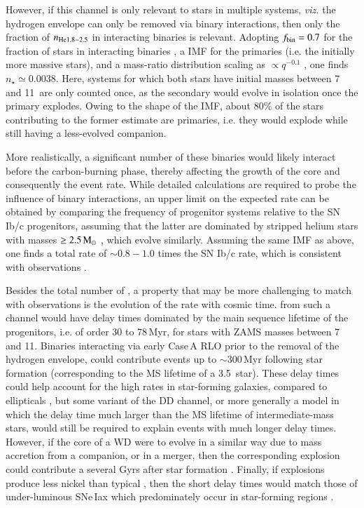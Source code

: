 \documentclass[twocolumn]{aa}
\begin{document}
However, if this channel is only relevant to stars in multiple systems, {\it viz.} the hydrogen envelope can only be removed via binary 
interactions, then only the fraction of $n_{\rm{He}1.8-2.5}$ in interacting binaries is relevant. 
Adopting $f_{\rm bin}=0.7$ for the fraction of stars in interacting binaries \citep{Sana:2012px}, a \cite{Chabrier:2004vw} IMF for the primaries (i.e. the 
initially more massive stars), and a mass-ratio distribution scaling as $\propto q^{-0.1}$ \citep{Sana:2012px}, one finds $n_\star \simeq 0.0038$. Here, systems for which both stars have initial masses between 7 and 11\msun\ are only counted once, as the secondary would evolve in isolation once the primary explodes. Owing to the shape of the IMF, about 80\% of the stars contributing to the former estimate are primaries, i.e. they would explode while still having a less-evolved companion. 

 More realistically, a significant number of these binaries would likely interact before the carbon-burning phase, thereby affecting the growth of the core and consequently the event rate. While detailed  calculations are required to probe the influence  of binary interactions, an upper limit on the expected rate can be obtained by comparing  the frequency of progenitor systems  relative to  the SN Ib/c progenitors, assuming that the latter are dominated by stripped helium stars with masses $\ge 2.5\mathrm{\,M_\odot}$ \citep{Woosley:2019sdf}, which evolve similarly. Assuming the same IMF as above, one finds a total rate of $\sim 0.8-1.0$ times the SN Ib/c rate, which is consistent with observations \citep[][and references therein]{branch2017}. 


Besides the total number of \ias, a property that may be more challenging to match with observations is the evolution of the \ia rate with cosmic time. \ias from such a channel would have delay times dominated by the main sequence lifetime of the progenitors, i.e. of order 30 to 78\,Myr, for stars with ZAMS masses between 7 and 11\msun. Binaries interacting via early Case\,A RLO prior to the removal of the hydrogen envelope, could contribute events up to $\sim 300$\,Myr following star formation (corresponding to the MS lifetime of a 3.5\msun\ star). 
These delay times could help account for the high \ia rates in star-forming galaxies, compared to ellipticals \citep{Maoz:2010pz,claeys2014}, but some variant of the DD channel, or more generally a model in which the delay time much larger than the MS lifetime of intermediate-mass stars, would still be required to explain events with much longer delay times.  
 However,  if the \one core of a WD  were to evolve in a similar way due to 
mass accretion from a companion, or in a merger, then the corresponding explosion could contribute a \ia several Gyrs after star formation \citep[see also][and references therein]{marquardt2015,Schwab:2015bma,Jones:2016asr,Schwab:2017epw,Schwab:2018cnb,kashyap2018,augustine2019}. 
Finally, if \one explosions produce less nickel than typical \ias, then the short delay times would match those of under-luminous SNe\,Iax which predominately occur in star-forming regions \citep{Jha:2017gwq}. 
\end{document}

